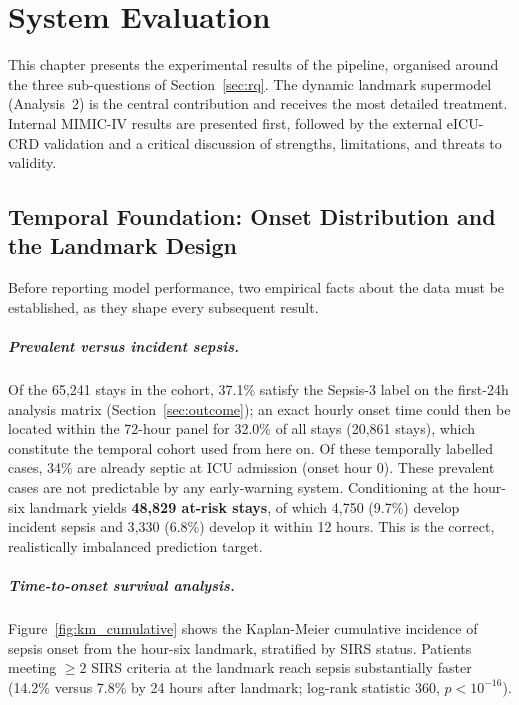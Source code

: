 \chapter{System Evaluation}
\label{ch:evaluation}

This chapter presents the experimental results of the pipeline, organised
around the three sub-questions of Section~\ref{sec:rq}. The dynamic landmark
supermodel (Analysis~2) is the central contribution and receives the most detailed
treatment. Internal MIMIC-IV results are presented first, followed by the
external eICU-CRD validation and a critical discussion of strengths,
limitations, and threats to validity.

\section{Temporal Foundation: Onset Distribution and the Landmark Design}

Before reporting model performance, two empirical facts about the data must be
established, as they shape every subsequent result.

\paragraph{Prevalent versus incident sepsis.}
Of the 65{,}241 stays in the cohort, 37.1\% satisfy the Sepsis-3 label on the
first-24h analysis matrix (Section~\ref{sec:outcome}); an exact hourly onset
time could then be located within the 72-hour panel for 32.0\% of all stays
(20{,}861 stays), which constitute the temporal cohort used from here on. Of
these temporally labelled cases, 34\% are already septic at ICU admission
(onset hour 0).
These prevalent cases are not predictable by any early-warning system.
Conditioning at the hour-six landmark yields \textbf{48{,}829 at-risk stays},
of which 4{,}750 (9.7\%) develop incident sepsis and 3{,}330 (6.8\%) develop
it within 12 hours. This is the correct, realistically imbalanced prediction
target.

\paragraph{Time-to-onset survival analysis.}
Figure~\ref{fig:km_cumulative} shows the Kaplan-Meier cumulative incidence of
sepsis onset from the hour-six landmark, stratified by SIRS status. Patients
meeting $\ge 2$ SIRS criteria at the landmark reach sepsis substantially faster
(14.2\% versus 7.8\% by 24 hours after landmark; log-rank statistic 360,
$p < 10^{-16}$).

